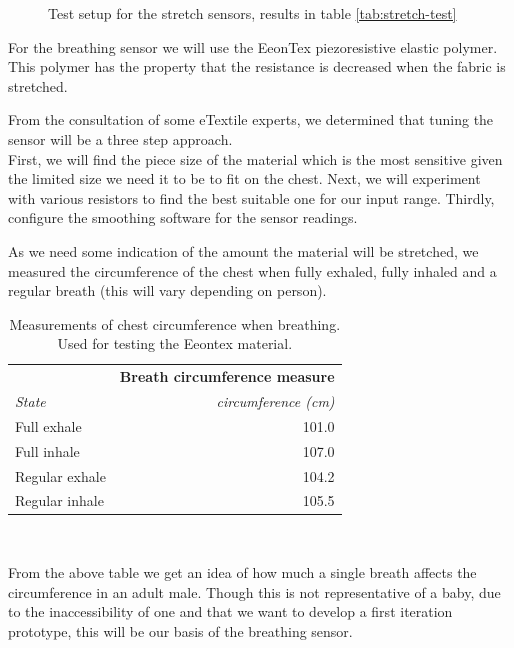 \documentclass{sigchi-ext}
\begin{document}
{{\begin{minipage}{0.925\marginparwidth}
\begin{figure} [H]
    \caption{Test setup for the stretch sensors, results in table \ref{tab:stretch-test}}
\end{figure}
    \end{minipage}}\label{sec:sidebar} }

For the breathing sensor we will use the EeonTex piezoresistive elastic polymer.
This polymer has the property that the resistance is decreased when the fabric
is stretched.

From the consultation of some eTextile experts, we determined
that tuning the sensor will be a three step approach.\\
First, we will find the piece size of the material which
is the most sensitive given the limited size we need it to be
to fit on the chest. Next, we will experiment with various
resistors to find the best suitable one for our input range.
Thirdly, configure the smoothing software for the sensor readings.

As we need some indication of the amount the material will
be stretched, we measured the circumference of the chest
when fully exhaled, fully inhaled and a regular breath
(this will vary depending on person).
\begin{table}[H]
  \centering
  \begin{tabular}{l r}
    & \multicolumn{1}{l}{\small{\textbf{Breath circumference measure}}} \\
    \cmidrule(r){1-2}
    {\small\textit{State}}
    & {\small \textit{circumference (cm)}} \\
    \midrule
    Full exhale    & 101.0 \\
    Full inhale    & 107.0 \\
    Regular exhale & 104.2 \\
    Regular inhale & 105.5  \\
  \end{tabular}
  \caption{Measurements of chest circumference when breathing. Used for testing the Eeontex material.}~\label{tab:circumference}
\end{table}
From the above table we get an idea of how much a single breath affects the circumference
in an adult male. Though this is not representative of a baby, due to the
inaccessibility of one and that we want to develop a first iteration prototype, this
will be our basis of the breathing sensor.
\end{document}
